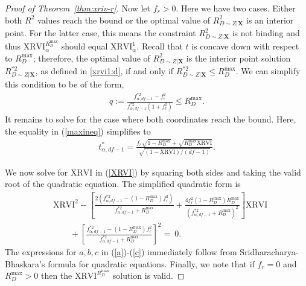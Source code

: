 \documentclass[sts]{imsart}
\theoremstyle{plain}
\theoremstyle{definition}
\newcommand{\df}{df}
\newcommand{\Rd}{R^2_{D\sim Z | \mathbf{X}}}
\newcommand{\Rdmax}{R^{\max }_{D}}
\newcommand{\fstarsq}{f^{* 2}_{\alpha, \df-1}}
\newcommand{\tstar}{t^*_{\alpha, \df-1}}
\newcommand{\XRVI}{\text{XRVI}}
\newcommand{\Rdstar}{R^{* 2}_{D\sim Z | \mathbf{X}}}
\begin{document}
\begin{appendix}
\begin{proof}[Proof of Theorem~\ref{thm:xriv-r}]
Now let $f_r>0$. Here we have two cases. Either both $R^2$ values reach the bound or the optimal value of $\Rd$ is an interior point. For the latter case, this means the constraint $\Rd$ is not binding and thus $\XRVI^{\Rdmax}_{\alpha}$ should equal  $\XRVI^{1}_{\alpha}$. Recall that $t$ is concave down with respect to $\Rdmax$; therefore, the optimal value of $\Rd$ is the interior point solution $\Rdstar$, as defined in \eqref{xrvi1:d}, if and only if $\Rdstar \leq \Rdmax$. We can simplify this condition to be of the form,
%
\begin{align*}
     q:=\frac{\fstarsq - f_r^2}{\fstarsq (1+ f_r^2)} \leq \Rdmax.
\end{align*}
It remains to solve for the case where both coordinates reach the bound. Here, the equality in (\ref{maxineq}) simplifies to
    \begin{align}
        {\textstyle \tstar = \frac{f_{r} \sqrt{1-\Rdmax} + \sqrt{\Rdmax\XRVI}}{\sqrt{(1-\XRVI)/(\df-1)}}.} \label{XRVI}
    \end{align}
    
We now solve for $\XRVI$ in (\ref{XRVI}) by squaring both sides and taking the valid root of the quadratic equation. The simplified quadratic form is
\begin{align}
        &{\scriptstyle \XRVI^2 - \left[ \frac{2(\fstarsq - (1-\Rdmax)f_r^2)}{\fstarsq + \Rdmax} + \frac{4f_r^2(1-\Rdmax)\Rdmax}{(\fstarsq + \Rdmax)^2} \right]\XRVI} \nonumber \\
        &{\scriptstyle \quad \quad + \left[\frac{\fstarsq - (1-\Rdmax)f_r^2}{\fstarsq + \Rdmax}\right]^2 = ~0. }
\end{align}
The expressions for $a,b,c$ in (\ref{a})-(\ref{c}) immediately follow from Sridharacharya-Bhaskara's formula for quadratic equations.  Finally, we note that if $f_r=0$ and $\Rdmax > 0$ then the $\XRVI^{\Rdmax}$ solution is valid. 
\end{proof}


\end{appendix}
\end{document}
